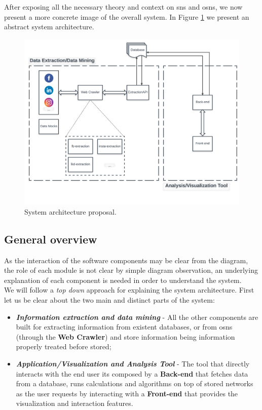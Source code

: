 After exposing all the necessary theory and context on \glspl{sn} and \glspl{osn}, we now present a more concrete image of the overall system. In Figure \ref{img:architectureprop} we present an abstract system architecture.

\begin{figure}[h!]
\begin{center}
  \hspace*{-0.3in}
  \includegraphics[width=1.1\textwidth]{img/architecture.png}
\end{center}
\caption{\label{img:architectureprop} System architecture proposal.}
\end{figure}

\subsection{General overview}
As the interaction of the software components may be clear from the diagram, the role of each module is not clear by simple
diagram observation, an underlying explanation of each component is needed in order to understand the system.\\
\indent We will follow a \textit{top down} approach for explaining the system architecture. First let us be clear about the two
main and distinct parts of the system:
\begin{itemize}
    \item \textbf{\textit{Information extraction and data mining}} - All the other components are built for extracting information
    from existent databases, or from \glspl{osn} (through the \textbf{Web Crawler}) and store information being information properly treated before stored;
    \item \textbf{\textit{Application/Visualization and Analysis Tool}} - The tool that directly interacts with the end user
    its composed by a \textbf{Back-end} that fetches data from a database, runs calculations and algorithms on top of stored networks
    as the user requests by interacting with a \textbf{Front-end} that provides the visualization and interaction features.
\end{itemize}


